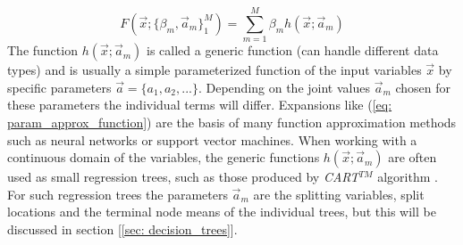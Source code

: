 \documentclass[12pt, a4paper]{article}
\begin{document}
\begin{equation}
    F(\vec{x};\{\beta_m, \vec{a}_m\}_1^M) = \sum_{m=1}^{M} \beta_m h(\vec{x};\vec{a}_m)
    \label{eq: param_approx_function}
\end{equation}
The function $h(\vec{x};\vec{a}_m)$ is called a generic function (can handle different data types) and is usually a simple parameterized function of the input variables $\vec{x}$ by specific parameters $\vec{a} = \{a_1,a_2,...\}$. Depending on the joint values $\vec{a}_m$ chosen for these parameters the individual terms will differ. Expansions like (\ref{eq: param_approx_function}) are the basis of many function approximation methods such as neural networks or support vector machines. When working with a continuous domain of the variables, the generic functions $h(\vec{x};\vec{a}_m)$ are often used as small regression trees, such as those produced by \textit{CART}$^{TM}$ algorithm \cite{Breiman1984}. For such regression trees the parameters $\vec{a}_m$ are the splitting variables, split locations and the terminal node means of the individual trees, but this will be discussed in section [\ref{sec: decision_trees}].
\newpage
\end{document}
